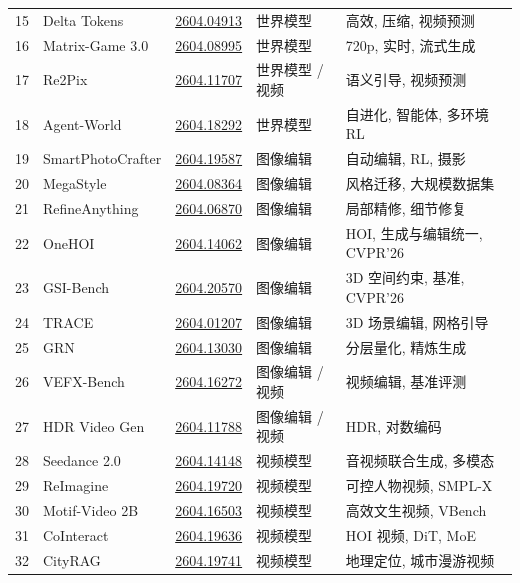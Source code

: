 \begin{longtable}{p{0.7cm}p{2.5cm}p{2.6cm}p{2.3cm}p{5.0cm}}
15 & Delta Tokens & \href{https://arxiv.org/abs/2604.04913}{2604.04913} & 世界模型 & 高效, 压缩, 视频预测 \\
16 & Matrix-Game 3.0 & \href{https://arxiv.org/abs/2604.08995}{2604.08995} & 世界模型 & 720p, 实时, 流式生成 \\
17 & Re2Pix & \href{https://arxiv.org/abs/2604.11707}{2604.11707} & 世界模型 / 视频 & 语义引导, 视频预测 \\
18 & Agent-World & \href{https://arxiv.org/abs/2604.18292}{2604.18292} & 世界模型 & 自进化, 智能体, 多环境 RL \\
19 & SmartPhotoCrafter & \href{https://arxiv.org/abs/2604.19587}{2604.19587} & 图像编辑 & 自动编辑, RL, 摄影 \\
20 & MegaStyle & \href{https://arxiv.org/abs/2604.08364}{2604.08364} & 图像编辑 & 风格迁移, 大规模数据集 \\
21 & RefineAnything & \href{https://arxiv.org/abs/2604.06870}{2604.06870} & 图像编辑 & 局部精修, 细节修复 \\
22 & OneHOI & \href{https://arxiv.org/abs/2604.14062}{2604.14062} & 图像编辑 & HOI, 生成与编辑统一, CVPR'26 \\
23 & GSI-Bench & \href{https://arxiv.org/abs/2604.20570}{2604.20570} & 图像编辑 & 3D 空间约束, 基准, CVPR'26 \\
24 & TRACE & \href{https://arxiv.org/abs/2604.01207}{2604.01207} & 图像编辑 & 3D 场景编辑, 网格引导 \\
25 & GRN & \href{https://arxiv.org/abs/2604.13030}{2604.13030} & 图像编辑 & 分层量化, 精炼生成 \\
26 & VEFX-Bench & \href{https://arxiv.org/abs/2604.16272}{2604.16272} & 图像编辑 / 视频 & 视频编辑, 基准评测 \\
27 & HDR Video Gen & \href{https://arxiv.org/abs/2604.11788}{2604.11788} & 图像编辑 / 视频 & HDR, 对数编码 \\
28 & Seedance 2.0 & \href{https://arxiv.org/abs/2604.14148}{2604.14148} & 视频模型 & 音视频联合生成, 多模态 \\
29 & ReImagine & \href{https://arxiv.org/abs/2604.19720}{2604.19720} & 视频模型 & 可控人物视频, SMPL-X \\
30 & Motif-Video 2B & \href{https://arxiv.org/abs/2604.16503}{2604.16503} & 视频模型 & 高效文生视频, VBench \\
31 & CoInteract & \href{https://arxiv.org/abs/2604.19636}{2604.19636} & 视频模型 & HOI 视频, DiT, MoE \\
32 & CityRAG & \href{https://arxiv.org/abs/2604.19741}{2604.19741} & 视频模型 & 地理定位, 城市漫游视频 \\

\end{longtable}
